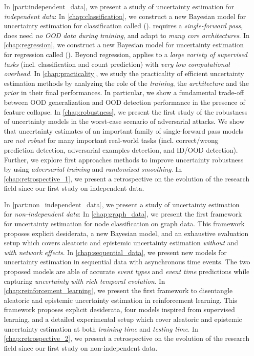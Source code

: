 In \cref{part:independent_data}, we present a study of uncertainty estimation for \emph{independent data}: 
In \cref{chap:classification}, we construct a new Bayesian model for uncertainty estimation for classification called \PostNet{} (\PostNetacro{}). \PostNetacro{} requires a \emph{single-forward pass}, does need \emph{no OOD data during training}, and adapt to \emph{many core architectures}.
In \cref{chap:regression}, we construct a new Bayesian model for uncertainty estimation for regression called \NatPN{} (\NatPNacro{}). Beyond regression, \NatPNacro{} applies to a \emph{large variety of supervised tasks} (incl. classification and count prediction) with \emph{very low computational overhead}.
In \cref{chap:practicality}, we study the practicality of efficient uncertainty estimation methods by analyzing the role of the \emph{training}, the \emph{architecture} and the \emph{prior} in their final performances. In particular, we show a fundamental trade-off between OOD generalization and OOD detection performance in the presence of feature collapse. 
In \cref{chap:robustness}, we present the first study of the robustness of uncertainty models in the worst-case scenario of adversarial attacks. We show that uncertainty estimates of an important family of single-forward pass models are \emph{not robust} for many important real-world tasks (incl. correct/wrong prediction detection, adversarial examples detection, and ID/OOD detection). Further, we explore first approaches methods to improve uncertainty robustness by using \emph{adversarial training} and \emph{randomized smoothing}.
In \cref{chap:retrospective_1}, we present a retrospective on the evolution of the research field since our first study on independent data.

In \cref{part:non_independent_data}, we present a study of uncertainty estimation for \emph{non-independent data}:
In \cref{chap:graph_data}, we present the first framework for uncertainty estimation for node classification on graph data. This framework proposes explicit desiderata, a new Bayesian model, and an exhaustive evaluation setup which covers aleatoric and epistemic uncertainty estimation \emph{without} and \emph{with network effects}.
In \cref{chap:sequential_data}, we present new models for uncertainty estimation in sequential data with asynchronous time events. The two proposed models are able of accurate \emph{event types} and \emph{event time} predictions while capturing \emph{uncertainty with rich temporal evolution}.
In \cref{chap:reinforcement_learning}, we present the first framework to disentangle aleatoric and epistemic uncertainty estimation in reinforcement learning. This framework proposes explicit desiderata, four models inspired from supervised learning, and a detailed experimental setup which cover aleatoric and epistemic uncertainty estimation at both \emph{training time} and \emph{testing time}.
In \cref{chap:retrospective_2}, we present a retrospective on the evolution of the research field since our first study on non-independent data.

